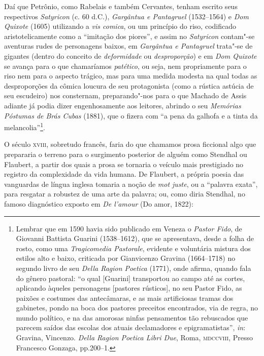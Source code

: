 Daí que Petrônio, como Rabelais e também Cervantes, tenham escrito seus
respectivos \emph{Satyricon} (c. 60 d.C.), \emph{Gargântua e Pantagruel}
(1532--1564) e \emph{Dom Quixote} (1605) utilizando a \emph{vis comica},
ou um princípio do riso, codificado aristotelicamente como a ``imitação
dos piores'', e assim no \emph{Satyricon} contam"-se aventuras rudes de
personagens baixos, em \emph{Gargântua e Pantagruel} trata"-se de
gigantes (dentro do conceito de \emph{deformidade} ou
\emph{desproporção}) e em \emph{Dom Quixote} se avança para o que
chamaríamos \emph{patético}, ou seja, nem propriamente para o riso nem
para o aspecto trágico, mas para uma medida modesta na qual todas as
desproporções da cômica loucura de seu protagonista (como a rústica
astúcia de seu escudeiro) nos consternam, preparando"-nos para o que
Machado de Assis adiante já podia dizer engenhosamente aos leitores,
abrindo o seu \emph{Memórias Póstumas de Brás Cubas} (1881), que o
fizera com ``a pena da galhofa e a tinta da melancolia''\footnote{Lembrar
  que em 1590 havia sido publicado em Veneza o \emph{Pastor Fido}, de
  Giovanni Battista Guarini (1538--1612), que se apresentava, desde a
  folha de rosto, como uma \emph{Tragicomedia Pastorale}, evidente e
  voluntária mistura dos estilos alto e baixo, criticada por Gianvicenzo
  Gravina (1664--1718) no segundo livro de seu \emph{Della Ragion
  Poetica} (1771), onde afirma, quando fala do gênero pastoral: ``o qual
  {[}Guarini{]} transportou ao campo até as cortes, aplicando àqueles
  personagens {[}pastores rústicos{]}, no seu Pastor Fido, as paixões e
  costumes das antecâmaras, e as mais artificiosas tramas dos gabinetes,
  pondo na boca dos pastores preceitos encontrados, via de regra, no
  mundo político, e na das amorosas ninfas pensamentos tão rebuscados
  que parecem saídos das escolas dos atuais declamadores e
  epigramatistas'', \emph{in}: Gravina, Vincenzo. \emph{Della Ragion
  Poetica Libri Due}, Roma, \textsc{mdccviii}, Presso Francesco Gonzaga,
  pp.200--1.}.

O século \textsc{xviii}, sobretudo francês, faria do que chamamos prosa ficcional
algo que prepararia o terreno para o surgimento posterior de alguém como
Stendhal ou Flaubert, a partir dos quais a prosa se tornaria o veículo
mais prestigiado no registro da complexidade da vida humana. De
Flaubert, a própria poesia das vanguardas de língua inglesa tomaria a
noção de \emph{mot juste}, ou a ``palavra exata'', para resgatar a
robustez de uma arte da palavra; ou, como diria Stendhal, no famoso
diagnóstico exposto em \emph{De l'amour} (Do amor, 1822):

